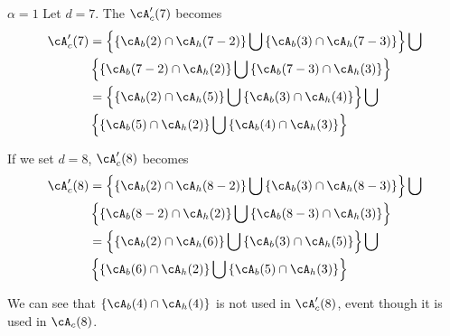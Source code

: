 \begin{example}
 $\alpha=1$\newline
Let $d=7$. The $\cA_c'(7)$ becomes
\begin{equation}
\begin{split}
\cA_c'(7) &= \left\{\left\{\cA_b(2) \cap \cA_h(7-2)\right\} \bigcup  \left\{\cA_b(3) \cap \cA_h(7-3)\right\} \right\} \bigcup \\
& \left\{\left\{\cA_b(7-2) \cap \cA_h(2)\right\} \bigcup  \left\{\cA_b(7-3) \cap \cA_h(3)\right\} \right\} \\
&=\left\{\left\{\cA_b(2) \cap \cA_h(5)\right\} \bigcup  \left\{\cA_b(3) \cap \cA_h(4)\right\} \right\} \bigcup \\
& \left\{\left\{\cA_b(5) \cap \cA_h(2)\right\} \bigcup  \left\{\cA_b(4) \cap \cA_h(3)\right\} \right\} \\
\end{split}
\end{equation}

If we set $d=8$, $\cA_c'(8)$ becomes
\begin{equation}
\begin{split}
\cA_c'(8) &= \left\{\left\{\cA_b(2) \cap \cA_h(8-2)\right\} \bigcup  \left\{\cA_b(3) \cap \cA_h(8-3)\right\} \right\} \bigcup \\
& \left\{\left\{\cA_b(8-2) \cap \cA_h(2)\right\} \bigcup  \left\{\cA_b(8-3) \cap \cA_h(3)\right\} \right\} \\
&=\left\{\left\{\cA_b(2) \cap \cA_h(6)\right\} \bigcup  \left\{\cA_b(3) \cap \cA_h(5)\right\} \right\} \bigcup \\
& \left\{\left\{\cA_b(6) \cap \cA_h(2)\right\} \bigcup  \left\{\cA_b(5) \cap \cA_h(3)\right\} \right\} \\
\end{split}
\end{equation}

We can see that $\left\{\cA_b(4) \cap \cA_h(4)\right\}$ is not used in $\cA_c'(8)$, event though it is used in $\cA_c(8)$.
\end{example}






